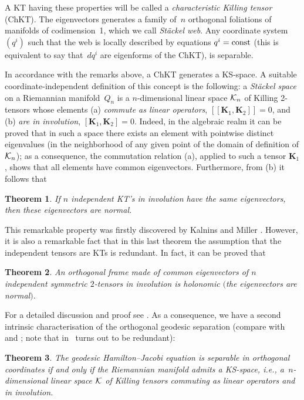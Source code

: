 \documentclass[pdftex]{sigma}
\def\bs{\boldsymbol}
\numberwithin{equation}{section}
\newtheorem{Theorem}{Theorem}[section]
 { \theoremstyle{definition}
\newtheorem{Notation}[Theorem]{Notation}
\newtheorem{Example}[Theorem]{Example}
\newtheorem{Remark}[Theorem]{Remark}
\newtheorem{Remarks}[Theorem]{Remarks}
 }
\begin{document}
A KT having these properties will be called a {\it characteristic Killing tensor} (ChKT). The eigenvectors generates a family of~$n$ orthogonal foliations  of manifolds of codimension~1, which we call {\it St\"ackel web}. Any coordinate system~$(q^i)$ such that the web is locally described by equations $q^i={\rm const}$ (this is equivalent to say that~$dq^i$ are eigenforms of the ChKT),
is separable.

In accordance with the remarks above, a ChKT generates a KS-space. A suitable coordinate-independent def\/inition of this concept is the following: a {\it St\"ackel space} on a Riemannian mani\-fold~$Q_n$ is a $n$-dimensional linear space ${\cal K}_n$ of Killing 2-tensors whose elements (a) {\it commute as linear operators}, $[ \! [\bs K_1,\bs K_2] \! ]=0$, and (b) {\it are in involution}, $[\bs K_1,\bs K_2]=0$. Indeed, in the algebraic realm it can be proved that in such a space there exists an element with pointwise distinct eigenvalues (in the neighborhood of any given point of the domain of def\/inition of ${\cal K}_n$); as a consequence, the commutation relation (a), applied to such a tensor $\bs K_1$, shows that all elements have common eigenvectors. Furthermore, from (b) it follows that

\begin{Theorem}\label{t:3.3}
If $n$ independent KT's in involution have the same eigenvectors, then these eigenvectors are normal.
\end{Theorem}

This remarkable property was f\/irstly discovered by Kalnins and Miller \cite{KM-1980}. However, it is also a remarkable fact that in this last theorem the assumption that the independent tensors are KTs is redundant. In fact, it can be proved that

\begin{Theorem}\label{t:3.4}
An orthogonal frame made of common eigenvectors of $n$ independent symmetric $2$-tensors in involution is holonomic $($the eigenvectors are normal$)$.
\end{Theorem}

For a detailed discussion and proof see \cite{BCR-2002a}. As a consequence, we have a second intrinsic characterisation of the orthogonal geodesic separation (compare with \cite[Theorem~6, Section~3]{KM-1980} and \cite{Shapovalov-1981}; note that in~\cite[Theorem~6(4)]{KM-1980}  turns out to be redundant):

\begin{Theorem}\label{t:3.5}
The geodesic Hamilton--Jacobi equation is separable in orthogonal coordinates if and only if the Riemannian manifold admits a KS-space, i.e., a~$n$-dimensional linear space ${\cal K}$ of Killing tensors commuting as linear operators and in involution.
\end{Theorem}
\end{document}
